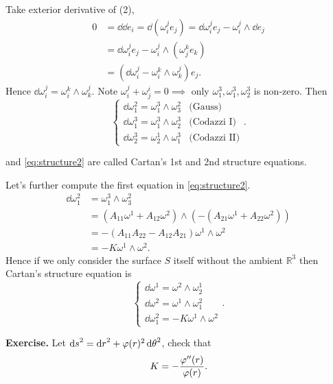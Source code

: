 Take exterior derivative of (2),
\begin{align*}
    0&=\dd{\dd{e_i}}=\dd{(\omega_i^je_j)}=\dd{\omega_i^j}e_j-\omega_i^j\wedge\dd{e_j}\\
    &=\dd{\omega_i^j}e_j-\omega_i^j\wedge (\omega_j^ke_k) \\
    &=(\dd{\omega_i^j}-\omega_i^k\wedge \omega_k^j)e_j
.\end{align*}
Hence \(\dd{\omega_i^j}=\omega_i^k\wedge \omega_k^j\). Note \(\omega_i^j+\omega_j^i=0
\implies\) only \(\omega_1^3,\omega_1^3,\omega_2^3\) is non-zero. Then\
\begin{equation}\label{eq:structure2}
    \begin{cases}
        \dd{\omega_1^2}=\omega_1^3\wedge \omega_3^2 & \text{(Gauss)} \\
        \dd{\omega_1^3}=\omega_1^3\wedge \omega_2^3 & \text{(Codazzi I)} \\
        \dd{\omega_2^3}=\omega_2^1\wedge \omega_1^3 & \text{(Codazzi II)}
    \end{cases}
.\end{equation}

 and \cref{eq:structure2} are called Cartan's 1st and 2nd
structure equations.

Let's further compute the first equation in \cref{eq:structure2}.
\begin{align*}
    \dd{\omega_1^2}&=\omega_1^3\wedge \omega_3^2 \\
    &=(A_{11}\omega^1+A_{12}\omega^2)\wedge (-(A_{21}\omega^1+A_{22}\omega^2)) \\
    &=-(A_{11}A_{22}-A_{12}A_{21})\omega^1\wedge\omega^2 \\
    &=-K\omega^1\wedge \omega^2
.\end{align*}
Hence if we only consider the surface \(S\) itself without the ambient \(\mathbb{R}^3\)
then Cartan's structure equation is
\begin{equation}\label{eq:cartan}
    \begin{cases}
        \dd{\omega^1}=\omega^2\wedge \omega_2^1 \\
        \dd{\omega^2}=\omega^1\wedge \omega_1^2 \\
        \dd{\omega_1^2}=-K\omega^1\wedge \omega^2
    \end{cases}
.\end{equation}

\noindent\textbf{Exercise.} Let \(\dd{s}^2=\dd{r}^2+\varphi(r)^2\dd{\theta}^2\),
check that \[
    K=-\frac{\varphi''(r)}{\varphi(r)}
.\] 

